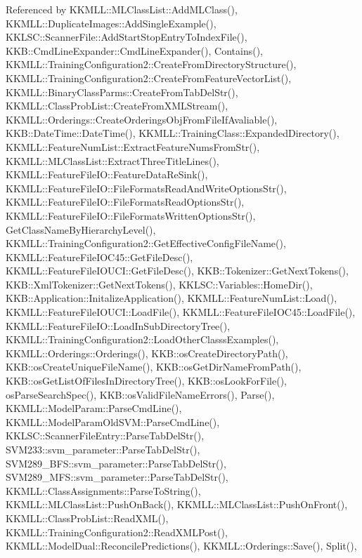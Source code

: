 Referenced by K\+K\+M\+L\+L\+::\+M\+L\+Class\+List\+::\+Add\+M\+L\+Class(), K\+K\+M\+L\+L\+::\+Duplicate\+Images\+::\+Add\+Single\+Example(), K\+K\+L\+S\+C\+::\+Scanner\+File\+::\+Add\+Start\+Stop\+Entry\+To\+Index\+File(), K\+K\+B\+::\+Cmd\+Line\+Expander\+::\+Cmd\+Line\+Expander(), Contains(), K\+K\+M\+L\+L\+::\+Training\+Configuration2\+::\+Create\+From\+Directory\+Structure(), K\+K\+M\+L\+L\+::\+Training\+Configuration2\+::\+Create\+From\+Feature\+Vector\+List(), K\+K\+M\+L\+L\+::\+Binary\+Class\+Parms\+::\+Create\+From\+Tab\+Del\+Str(), K\+K\+M\+L\+L\+::\+Class\+Prob\+List\+::\+Create\+From\+X\+M\+L\+Stream(), K\+K\+M\+L\+L\+::\+Orderings\+::\+Create\+Orderings\+Obj\+From\+File\+If\+Avaliable(), K\+K\+B\+::\+Date\+Time\+::\+Date\+Time(), K\+K\+M\+L\+L\+::\+Training\+Class\+::\+Expanded\+Directory(), K\+K\+M\+L\+L\+::\+Feature\+Num\+List\+::\+Extract\+Feature\+Nums\+From\+Str(), K\+K\+M\+L\+L\+::\+M\+L\+Class\+List\+::\+Extract\+Three\+Title\+Lines(), K\+K\+M\+L\+L\+::\+Feature\+File\+I\+O\+::\+Feature\+Data\+Re\+Sink(), K\+K\+M\+L\+L\+::\+Feature\+File\+I\+O\+::\+File\+Formats\+Read\+And\+Write\+Options\+Str(), K\+K\+M\+L\+L\+::\+Feature\+File\+I\+O\+::\+File\+Formats\+Read\+Options\+Str(), K\+K\+M\+L\+L\+::\+Feature\+File\+I\+O\+::\+File\+Formats\+Written\+Options\+Str(), Get\+Class\+Name\+By\+Hierarchy\+Level(), K\+K\+M\+L\+L\+::\+Training\+Configuration2\+::\+Get\+Effective\+Config\+File\+Name(), K\+K\+M\+L\+L\+::\+Feature\+File\+I\+O\+C45\+::\+Get\+File\+Desc(), K\+K\+M\+L\+L\+::\+Feature\+File\+I\+O\+U\+C\+I\+::\+Get\+File\+Desc(), K\+K\+B\+::\+Tokenizer\+::\+Get\+Next\+Tokens(), K\+K\+B\+::\+Xml\+Tokenizer\+::\+Get\+Next\+Tokens(), K\+K\+L\+S\+C\+::\+Variables\+::\+Home\+Dir(), K\+K\+B\+::\+Application\+::\+Initalize\+Application(), K\+K\+M\+L\+L\+::\+Feature\+Num\+List\+::\+Load(), K\+K\+M\+L\+L\+::\+Feature\+File\+I\+O\+U\+C\+I\+::\+Load\+File(), K\+K\+M\+L\+L\+::\+Feature\+File\+I\+O\+C45\+::\+Load\+File(), K\+K\+M\+L\+L\+::\+Feature\+File\+I\+O\+::\+Load\+In\+Sub\+Directory\+Tree(), K\+K\+M\+L\+L\+::\+Training\+Configuration2\+::\+Load\+Other\+Classs\+Examples(), K\+K\+M\+L\+L\+::\+Orderings\+::\+Orderings(), K\+K\+B\+::os\+Create\+Directory\+Path(), K\+K\+B\+::os\+Create\+Unique\+File\+Name(), K\+K\+B\+::os\+Get\+Dir\+Name\+From\+Path(), K\+K\+B\+::os\+Get\+List\+Of\+Files\+In\+Directory\+Tree(), K\+K\+B\+::os\+Look\+For\+File(), os\+Parse\+Search\+Spec(), K\+K\+B\+::os\+Valid\+File\+Name\+Errors(), Parse(), K\+K\+M\+L\+L\+::\+Model\+Param\+::\+Parse\+Cmd\+Line(), K\+K\+M\+L\+L\+::\+Model\+Param\+Old\+S\+V\+M\+::\+Parse\+Cmd\+Line(), K\+K\+L\+S\+C\+::\+Scanner\+File\+Entry\+::\+Parse\+Tab\+Del\+Str(), S\+V\+M233\+::svm\+\_\+parameter\+::\+Parse\+Tab\+Del\+Str(), S\+V\+M289\+\_\+\+B\+F\+S\+::svm\+\_\+parameter\+::\+Parse\+Tab\+Del\+Str(), S\+V\+M289\+\_\+\+M\+F\+S\+::svm\+\_\+parameter\+::\+Parse\+Tab\+Del\+Str(), K\+K\+M\+L\+L\+::\+Class\+Assignments\+::\+Parse\+To\+String(), K\+K\+M\+L\+L\+::\+M\+L\+Class\+List\+::\+Push\+On\+Back(), K\+K\+M\+L\+L\+::\+M\+L\+Class\+List\+::\+Push\+On\+Front(), K\+K\+M\+L\+L\+::\+Class\+Prob\+List\+::\+Read\+X\+M\+L(), K\+K\+M\+L\+L\+::\+Training\+Configuration2\+::\+Read\+X\+M\+L\+Post(), K\+K\+M\+L\+L\+::\+Model\+Dual\+::\+Reconcile\+Predictions(), K\+K\+M\+L\+L\+::\+Orderings\+::\+Save(), Split(), 